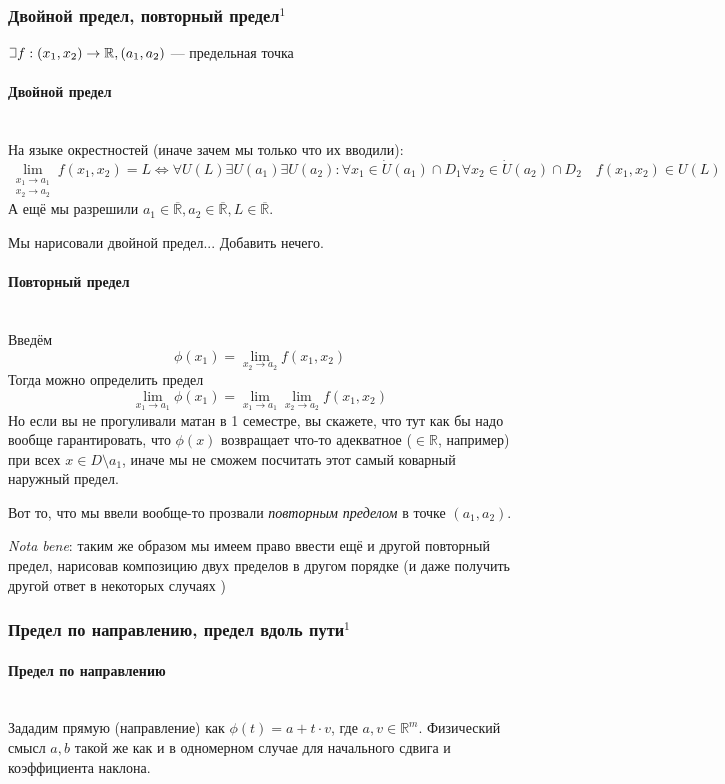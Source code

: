 \documentclass{article}
\def\letus{%
\mathord{\setbox0=\hbox{$\exists$}%
         \hbox{\kern 0.125\wd0%
               \vbox to \ht0{%
                  \hrule width 0.75\wd0%
                  \vfill%
                  \hrule width 0.75\wd0}%
               \vrule height \ht0%
               \kern 0.125\wd0}%
       }%
        }
\let\vanillaparagraph\paragraph
\renewcommand{\paragraph}[1]{\vanillaparagraph{#1}\mbox{}\\}
\begin{document}
\subsubsection{Двойной предел, повторный предел\texorpdfstring{$^1$}{}}
$\letus f: (x_1, x_2) \rightarrow \mathbb{R}, (a_1, a_2)$ --- предельная точка

\paragraph{Двойной предел}
На языке окрестностей (иначе зачем мы только что их вводили):
$$
\lim_{\begin{array}{c} x_1\rightarrow a_1 \\ x_2 \rightarrow a_2 \end{array}} f(x_1, x_2) = L \Leftrightarrow \forall U(L) \exists U(a_1) \exists U(a_2) : \forall x_1 \in \dot{U}(a_1) \cap D_1 \forall x_2 \in \dot{U}(a_2) \cap D_2 \quad f(x_1, x_2) \in U(L) 
$$
А ещё мы разрешили $a_1 \in \overline{\mathbb{R}}, a_2 \in \overline{\mathbb{R}}, L \in \overline{\mathbb{R}}$.

Мы нарисовали двойной предел... Добавить нечего.

\paragraph{Повторный предел}
Введём 
$$\phi(x_1) = \lim_{x_2 \rightarrow a_2} f(x_1, x_2)$$
Тогда можно определить предел
$$
\lim_{x_1\rightarrow a_1} \phi(x_1) = \lim_{x_1\rightarrow a_1} \lim_{x_2 \rightarrow a_2} f(x_1, x_2)
$$
Но если вы не прогуливали матан в 1 семестре, вы скажете, что тут как бы надо вообще гарантировать, что $\phi(x)$ возвращает что-то адекватное ($\in \mathbb{R}$, например) при всех $x \in D \setminus a_1$, иначе мы не сможем посчитать этот самый коварный наружный предел.

Вот то, что мы ввели вообще-то прозвали \textit{повторным пределом} в точке $(a_1, a_2)$.

\textit{Nota bene}: таким же образом мы имеем право ввести ещё и другой повторный предел, нарисовав композицию двух пределов в другом порядке (и даже получить другой ответ в некоторых случаях \Smiley)

\subsubsection{Предел по направлению, предел вдоль пути\texorpdfstring{$^1$}{}}
\paragraph{Предел по направлению}
Зададим прямую (направление) как $\phi(t) = a + t\cdot v$, где $a, v \in \mathbb{R}^m$. Физический смысл $a, b$ такой же как и в одномерном случае для начального сдвига и коэффициента наклона.
\end{document}
